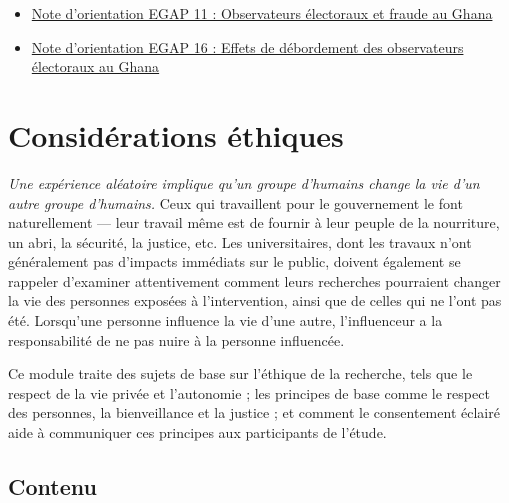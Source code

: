 \documentclass[12pt,]{book}
\begin{document}
\begin{itemize}
\item
  \href{https://egap.org/resource/brief-11-election-observers-and-fraud-in-ghana/}{Note d'orientation EGAP 11 : Observateurs électoraux et fraude au Ghana}
\item
  \href{https://egap.org/resource/brief-16-spillover-effects-of-observers-in-ghana/}{Note d'orientation EGAP 16 : Effets de débordement des observateurs électoraux au Ghana}
\end{itemize}

\hypertarget{considuxe9rations-uxe9thiques}{%
\chapter{Considérations éthiques}\label{considuxe9rations-uxe9thiques}}

\emph{Une expérience aléatoire implique qu'un groupe d'humains change la vie d'un autre groupe d'humains.} Ceux qui travaillent pour le gouvernement le font naturellement --- leur travail même est de fournir à leur peuple de la nourriture, un abri, la sécurité, la justice, etc.
Les universitaires, dont les travaux n'ont généralement pas d'impacts immédiats sur le public, doivent également se rappeler d'examiner attentivement comment leurs recherches pourraient changer la vie des personnes exposées à l'intervention, ainsi que de celles qui ne l'ont pas été. Lorsqu'une personne influence la vie d'une autre, l'influenceur a la responsabilité de ne pas nuire à la personne influencée.

Ce module traite des sujets de base sur l'éthique de la recherche, tels que le respect de la vie privée et l'autonomie ; les principes de base comme le respect des personnes, la bienveillance et la justice ; et comment le consentement éclairé aide à communiquer ces principes aux participants de l'étude.

\hypertarget{contenu-8}{%
\section{Contenu}\label{contenu-8}}
\end{document}

